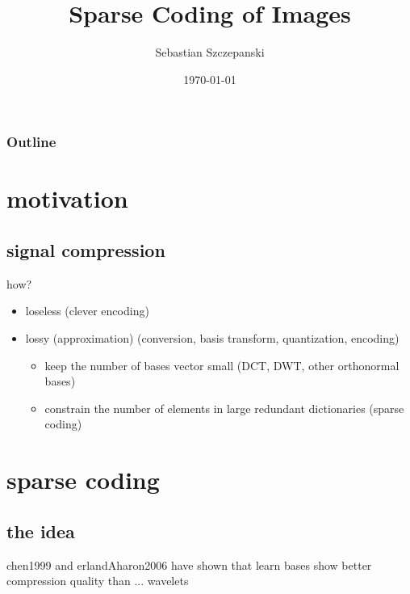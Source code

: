 




\title{Sparse Coding of Images}
\author{Sebastian Szczepanski}
\date{\today}

\begin{frame}
\titlepage
\end{frame}

\begin{frame}
\frametitle{Outline}
\tableofcontents %
\end{frame}


\section{motivation}
\subsection{signal compression}
\begin{frame}
how? 

\begin{itemize}
\item loseless (clever encoding) 
\item lossy (approximation) (conversion, basis transform, quantization, encoding) \
\pause
	\begin{itemize}
	\item  keep the number of bases vector small (DCT, DWT, other orthonormal bases)	
	\pause
	\item constrain the number of elements in large redundant dictionaries (sparse coding)
	\end{itemize}
\end{itemize}
\end{frame}

\section{sparse coding}



\subsection{the idea}
\begin{frame}
chen1999 and erlandAharon2006 have shown that learn bases show better compression quality
than ... wavelets 
\end{frame}

